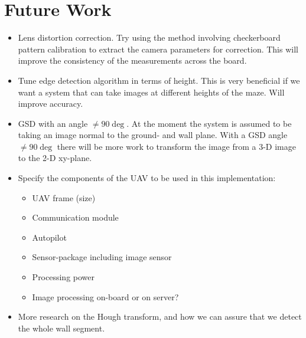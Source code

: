 \section{Future Work}
\begin{itemize}
\item Lens distortion correction. Try using the method involving checkerboard pattern calibration to extract the camera parameters for correction. This will improve the consistency of the measurements across the board.
\item Tune edge detection algorithm in terms of height. This is very beneficial if we want a system that can take images at different heights of the maze. Will improve accuracy.
\item GSD with an angle $\neq 90 \deg$. At the moment the system is assumed to be taking an image normal to the ground- and wall plane. With a GSD angle $\neq 90 \deg$ there will be more work to transform the image from a 3-D image to the 2-D xy-plane.
\item Specify the components of the UAV to be used in this implementation:
\begin{itemize}
\item UAV frame (size)
\item Communication module
\item Autopilot
\item Sensor-package including image sensor
\item Processing power
\item Image processing on-board or on server?
\end{itemize}

\item More research on the Hough transform, and how we can assure that we detect the whole wall segment.

\end{itemize}
